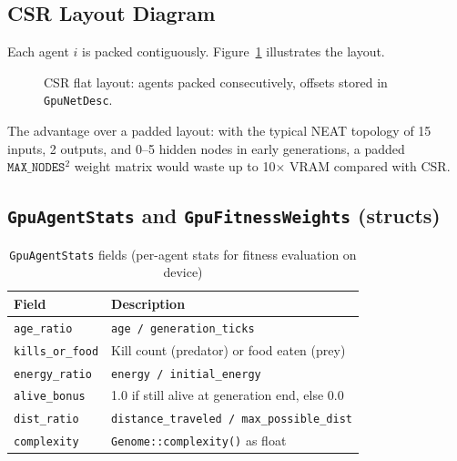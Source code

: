 \subsection{CSR Layout Diagram}

Each agent $i$ is packed contiguously.  Figure~\ref{fig:csr} illustrates the layout.

\begin{figure}[H]
\centering
\small
{}
\caption{CSR flat layout: agents packed consecutively, offsets stored in
\texttt{GpuNetDesc}.}
\label{fig:csr}
\end{figure}

The advantage over a padded layout: with the typical NEAT topology of 15 inputs, 2
outputs, and 0–5 hidden nodes in early generations, a padded
$\texttt{MAX\_NODES}^2$ weight matrix would waste up to 10× VRAM compared with CSR.

\subsection{\texttt{GpuAgentStats} and \texttt{GpuFitnessWeights} (structs)}

\begin{table}[H]
\centering\small
\caption{\texttt{GpuAgentStats} fields (per-agent stats for fitness evaluation on device)}
\begin{tabularx}{\textwidth}{@{}lX@{}}
\toprule
\textbf{Field} & \textbf{Description} \\
\midrule
\texttt{age\_ratio}      & \texttt{age / generation\_ticks} \\
\texttt{kills\_or\_food} & Kill count (predator) or food eaten (prey) \\
\texttt{energy\_ratio}   & \texttt{energy / initial\_energy} \\
\texttt{alive\_bonus}    & 1.0 if still alive at generation end, else 0.0 \\
\texttt{dist\_ratio}     & \texttt{distance\_traveled / max\_possible\_dist} \\
\texttt{complexity}      & \texttt{Genome::complexity()} as float \\
\bottomrule
\end{tabularx}
\end{table}

